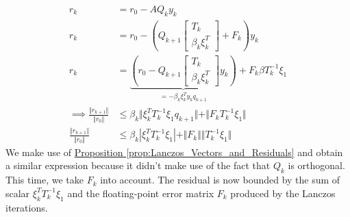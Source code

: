 \documentclass[]{article}
\theoremstyle{definition}
\begin{document}
            \begin{align}
                r_k &= r_0 - AQ_ky_k
                \\
                r_k &= r_0 - 
                    \left(
                        Q_{k + 1} \begin{bmatrix}
                            T_k
                            \\
                            \beta_k \xi_k^T
                        \end{bmatrix}
                        + 
                        F_k
                    \right)
                y_k
                \\
                r_k &= 
                \underbrace{\left(
                    r_0 - Q_{k + 1}\begin{bmatrix}
                        T_k
                        \\
                        \beta_k \xi_k^T
                    \end{bmatrix}y_k
                \right)}_{= -\beta_k\xi_k^Ty_kq_{k + 1}} + F_k \beta T_k^{-1}\xi_1
                \\
                \implies
                \frac{\Vert r_{k + 1}\Vert}
                {
                    \Vert r_0\Vert
                } &\le
                \beta_k \Vert
                    \xi_k^T T_k^{-1}\xi_1 q_{k + 1}
                \Vert + 
                \Vert F_kT_k^{-1}\xi_1 \Vert
                \\
                \frac{\Vert r_{k + 1}\Vert}
                {
                    \Vert r_0\Vert
                } 
                &\le 
                \beta_k |
                    \xi_k^T T_k^{-1}\xi_1
                | + 
                \Vert F_k\Vert  \Vert T_k^{-1}\xi_1\Vert
            \end{align}
            We make use of \hyperref[prop:Lanczos_Vectors_and_Residuals]{Proposition \ref*{prop:Lanczos_Vectors_and_Residuals}} and obtain a similar expression because it didn't make use of the fact that $Q_k$ is orthogonal. This time, we take $F_k$ into account. The residual is now bounded by the sum of scalar $\xi_k^T T_k^{-1}\xi_1$ and the floating-point error matrix $F_k$ produced by the Lanczos iterations. 
\end{document}
